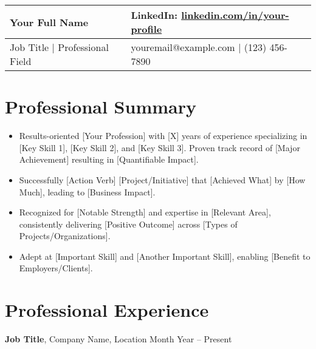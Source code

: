 \documentclass[a4paper,10pt]{article}
\begin{document}
\noindent

\begin{tabular}{@{}p{3.5in} p{3.5in}@{}}

    {\bfseries\LARGE Your Full Name} & \hfill LinkedIn: \href{https://www.linkedin.com/in/your-profile/}{linkedin.com/in/your-profile} \\
    
    \hline 
    
    Job Title | Professional Field & \hfill youremail@example.com | (123) 456-7890
\end{tabular}

\section*{Professional Summary}

\begin{itemize}
    \item Results-oriented [Your Profession] with [X] years of experience specializing in [Key Skill 1], [Key Skill 2], and [Key Skill 3]. Proven track record of [Major Achievement] resulting in [Quantifiable Impact].
    
    \item Successfully [Action Verb] [Project/Initiative] that [Achieved What] by [How Much], leading to [Business Impact].
    
    \item Recognized for [Notable Strength] and expertise in [Relevant Area], consistently delivering [Positive Outcome] across [Types of Projects/Organizations].
    
    \item Adept at [Important Skill] and [Another Important Skill], enabling [Benefit to Employers/Clients].
\end{itemize}

\section*{Professional Experience}

\vspace{4pt}
{\bfseries Job Title}, Company Name, Location \hfill Month Year -- Present
\end{document}
